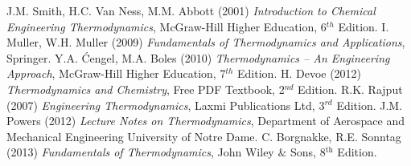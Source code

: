 \documentclass[11pt,oneside,a4paper]{article}
\begin{document}
\begin{thebibliography}{1}
%
 J.M. Smith, H.C. Van Ness, M.M. Abbott (2001) {\it Introduction to Chemical Engineering Thermodynamics}, McGraw-Hill Higher Education, 6$^{th}$ Edition.
%
 I. Muller, W.H. Muller (2009) {\it Fundamentals of Thermodynamics and Applications}, Springer.
%
 Y.A. \'Cengel, M.A. Boles (2010) {\it Thermodynamics -- An Engineering Approach}, McGraw-Hill Higher Education, 7$^{th}$ Edition.
%
 H. Devoe (2012) {\it Thermodynamics and Chemistry}, Free PDF Textbook, 2$^{nd}$ Edition.
%
 R.K. Rajput (2007) {\it Engineering Thermodynamics}, Laxmi Publications Ltd, 3$^{rd}$ Edition.
%
 J.M. Powers (2012) {\it Lecture Notes on Thermodynamics}, Department of Aerospace and Mechanical Engineering University of Notre Dame.
%
 C. Borgnakke, R.E. Sonntag (2013) {\it Fundamentals of Thermodynamics}, John Wiley $\&$ Sons, 8$^{\text{th}}$ Edition.
%
\end{thebibliography}
\end{document}
